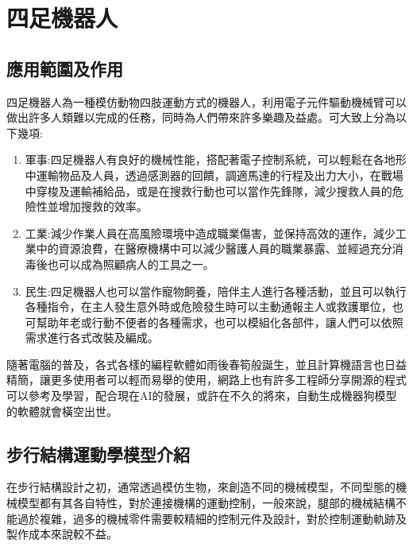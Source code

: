 \chapter{四足機器人}
\section{應用範圍及作用}
四足機器人為一種模仿動物四肢運動方式的機器人，利用電子元件驅動機械臂可以做出許多人類難以完成的任務，同時為人們帶來許多樂趣及益處。可大致上分為以下幾項:\\
\begin{enumerate}
\item 軍事:四足機器人有良好的機械性能，搭配著電子控制系統，可以輕鬆在各地形中運輸物品及人員，透過感測器的回饋，調適馬達的行程及出力大小，在戰場中穿梭及運輸補給品，或是在搜救行動也可以當作先鋒隊，減少搜救人員的危險性並增加搜救的效率。\\
\item 工業:減少作業人員在高風險環境中造成職業傷害，並保持高效的運作，減少工業中的資源浪費，在醫療機構中可以減少醫護人員的職業暴露、並經過充分消毒後也可以成為照顧病人的工具之一。\\
\item 民生:四足機器人也可以當作寵物飼養，陪伴主人進行各種活動，並且可以執行各種指令，在主人發生意外時或危險發生時可以主動通報主人或救護單位，也可幫助年老或行動不便者的各種需求，也可以模組化各部件，讓人們可以依照需求進行各式改裝及編成。\\
\end{enumerate}
隨著電腦的普及，各式各樣的編程軟體如雨後春筍般誕生，並且計算機語言也日益精簡，讓更多使用者可以輕而易舉的使用，網路上也有許多工程師分享開源的程式可以參考及學習，配合現在AI的發展，或許在不久的將來，自動生成機器狗模型的軟體就會橫空出世。\\[6pt]
\newpage
\section{步行結構運動學模型介紹}

在步行結構設計之初，通常透過模仿生物，來創造不同的機械模型，不同型態的機械模型都有其各自特性，對於連接機構的運動控制，一般來說，腿部的機械結構不能過於複雜，過多的機械零件需要較精細的控制元件及設計，對於控制運動軌跡及製作成本來說較不益。\\

